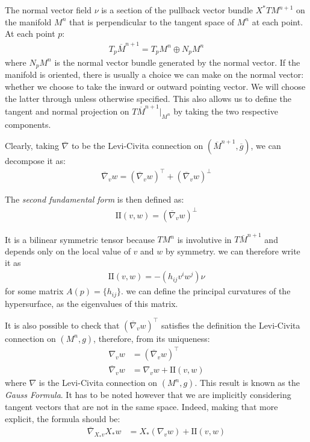 The normal vector field $\nu$ is a section of the pullback vector bundle $X^* TM^{n+1}$ on the manifold $M^n$ that is perpendicular to the tangent space of $M^n$ at each point. At each point $p$:
\begin{align*}
	T_p\overline{M}^{n+1}=T_pM^{n}\oplus N_pM^{n}
\end{align*} 
where $N_pM^{n}$ is the normal vector bundle generated by the normal vector. If the manifold is oriented, there is usually a choice we can make on the normal vector: whether we choose to take the inward or outward pointing vector. We will choose the latter through unless otherwise specified. This also allows us to define the tangent and normal projection on $T\overline{M}^{n+1}|_{M^n}$ by taking the two respective components. 

Clearly, taking $\overline{\nabla}$ to be the Levi-Civita connection on $(\overline{M}^{n+1}, \overline{g})$, we can decompose it as:
\begin{align*}
	\overline{\nabla}_v w = (\overline{\nabla}_v w )^\top +  (\overline{\nabla}_v w )^\bot
\end{align*} 

\begin{defin}
	The {\em second fundamental form} is then defined as: 
	\begin{align*}
	 	\mathrm{I\!I} (v, w) =  (\overline{\nabla}_v w )^\bot 	
	\end{align*} 
\end{defin}
It is a bilinear symmetric tensor because $TM^n$ is involutive in $T\overline{M}^{n+1}$ and depends only on the local value of $v$ and $w$ by symmetry. we can therefore write it as
\begin{align*}
	\mathrm{I\!I} (v, w) = -(h_{ij}v^iw^j)\nu
\end{align*} 
for some matrix $A(p)=\{h_{ij}\}$. we can define the principal curvatures of the hypersurface, as the eigenvalues of this matrix.

It is also possible to check that $(\overline{\nabla}_v w )^\top$ satisfies the definition the Levi-Civita connection on $(M^n, g)$, therefore, from its uniqueness:
\begin{align*}
	\nabla_v w &=  (\overline{\nabla}_v w )^\top	\\
	\overline{\nabla}_v w &= \nabla_v w  + \mathrm{I\!I} (v, w) 
\end{align*} 
where $\nabla$ is the Levi-Civita connection on $(M^n, g)$. This result is known as the {\em Gauss Formula}. It has to be noted however that we are implicitly considering tangent vectors that are not in the same space. Indeed, making that more explicit, the formula should be:
\begin{align*}
	\overline{\nabla}_{X_*v} X_* w &= X_* (\nabla_v w)  + \mathrm{I\!I} (v, w) 
\end{align*}

